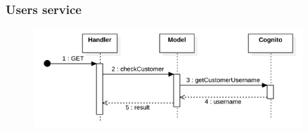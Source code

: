 \subsubsection{Users service}
\begin{figure}[H]
    \includegraphics[width=0.9\textwidth]{res/images/sequence-diagrams/users/checkCustomer.png}
\end{figure}
